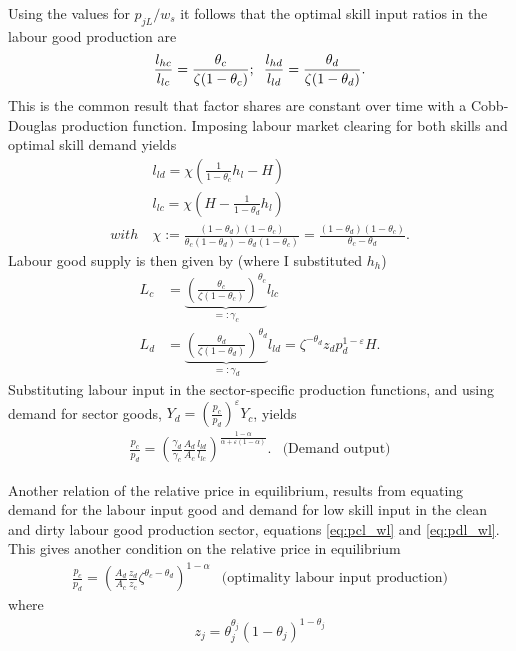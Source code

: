 Using the values for $p_{jL}/w_s$ it follows that the optimal skill input ratios in the labour good production are
\begin{align*}
\frac{l_{hc}}{l_{lc}}=\frac{\theta_c}{\zeta (1-\theta_c)}; \hspace{2mm} \frac{l_{hd}}{l_{ld}}=\frac{\theta_d}{\zeta (1-\theta_d)}.
\end{align*}
This is the common result that  factor shares 
 are constant over time with a Cobb-Douglas production function. 
Imposing labour market clearing for both skills and optimal skill demand  yields 
\begin{align}
&l_{ld}=\chi\left(\frac{1}{1-\theta_c}h_l-H\right)\label{eq:lld}\\ %
& l_{lc}=\chi \left(H-\frac{1}{1-\theta_d}h_l\right)\label{eq:llc}\\
with \ & \chi:= \frac{(1-\theta_d)(1-\theta_c)}{\theta_c(1-\theta_d)-\theta_d(1-\theta_c)}=\frac{(1-\theta_d)(1-\theta_c)}{\theta_c-\theta_d}.
\end{align}
Labour good supply is then given by (where I substituted $h_h$)
\begin{align}
L_c&=\underbrace{\left(\frac{\theta_c}{\zeta(1-\theta_c)}\right)^{\theta_c}}_{=:\gamma_c}l_{lc}\label{eq:lab_inputc} \\
L_d&=\underbrace{\left(\frac{\theta_d}{\zeta(1-\theta_d)}\right)^{\theta_d}}_{=:\gamma_d}l_{ld}= \zeta^{-\theta_d}z_dp_d^{1-\varepsilon}H.\label{eq:lab_inputd}
\end{align}
Substituting labour input in the sector-specific production functions, and using demand for sector goods, $Y_d=\left(\frac{p_c}{p_d}\right)^\varepsilon Y_c$, yields
\begin{align}\label{eq:price_ratio_output}
\frac{p_c}{p_d} =\left(\frac{\gamma_d}{\gamma_c}\frac{A_d}{A_c}\frac{l_{ld}}{l_{lc}}\right)^{\frac{1-\alpha}{\alpha+\varepsilon(1-\alpha)}}.& \text{(Demand output)}
\end{align}

Another relation of the relative price in equilibrium, results from equating demand for the labour input good and  demand for low skill input in the clean and dirty labour good production sector, equations \ref{eq:pcl_wl} and \ref{eq:pdl_wl}. This gives another condition on the relative price in equilibrium
\begin{align}\label{eq:price_ratio_labourinput}
\frac{p_c}{p_d}= \left(\frac{A_d}{A_c}\frac{z_d}{z_c}\zeta^{\theta_c-\theta_d}\right)^{1-\alpha}& \text{(optimality labour input production)}
\end{align}
where
\begin{align*}
z_j=\theta_j^{\theta_j}(1-\theta_j)^{1-\theta_j}
\end{align*}

